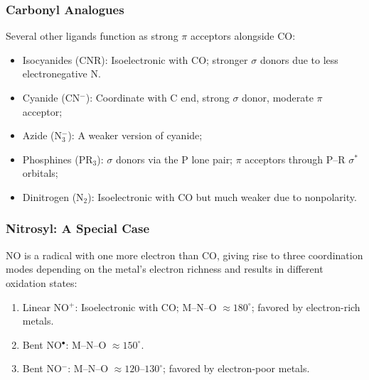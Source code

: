 \subsubsection{Carbonyl Analogues}
%
Several other ligands function as strong $\pi$ acceptors alongside CO:
%
\begin{itemize}
	\item Isocyanides (CNR): Isoelectronic with CO; stronger $\sigma$ donors due to less electronegative N.
	\item Cyanide (CN$^-$): Coordinate with C end, strong $\sigma$ donor, moderate $\pi$ acceptor;
	\item Azide (N$_3^-$): A weaker version of cyanide;
	\item Phosphines (PR$_3$): $\sigma$ donors via the P lone pair; $\pi$ acceptors through P--R $\sigma^*$ orbitals;
	\item Dinitrogen (N$_2$): Isoelectronic with CO but much weaker due to nonpolarity.
\end{itemize}
%
\subsubsection{Nitrosyl: A Special Case}
%
NO is a radical with one more electron than CO,
giving rise to three coordination modes depending on the metal's electron richness and results in different oxidation states:
%
\begin{enumerate}
	\item Linear NO$^+$: Isoelectronic with CO; M--N--O $\approx 180^\circ$; favored by electron-rich metals.
	\item Bent NO$^\bullet$: M--N--O $\approx 150^\circ$.
	\item Bent NO$^-$: M--N--O $\approx 120$--$130^\circ$; favored by electron-poor metals.
\end{enumerate}
%
